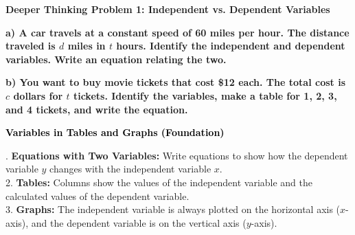 \documentclass[12pt, letterpaper, fleqn]{article}
\begin{document}
\vspace{4mm}

\begin{tcolorbox}[colback=black!5, colframe=black!50, boxrule=1pt, arc=4mm, left=6mm, right=6mm, top=5mm, bottom=5mm]
\textbf{Deeper Thinking Problem 1: Independent vs. Dependent Variables}

\medskip

\noindent
\textbf{a) A car travels at a constant speed of 60 miles per hour. The distance traveled is $d$ miles in $t$ hours. Identify the independent and dependent variables. Write an equation relating the two.}

\vspace{2.5cm}

\noindent
\textbf{b) You want to buy movie tickets that cost \$12 each. The total cost is $c$ dollars for $t$ tickets. Identify the variables, make a table for 1, 2, 3, and 4 tickets, and write the equation.}

\vspace{2cm}
\end{tcolorbox}
\newpage

\begin{tcolorbox}[colback=black!10]
    \large\textcolor{black}{\textbf{Variables in Tables and Graphs (Foundation)}}
\end{tcolorbox}

\vspace{3mm}

. \textbf{Equations with Two Variables:} Write equations to show how the dependent variable $y$ changes with the independent variable $x$. \\
2. \textbf{Tables:} Columns show the values of the independent variable and the calculated values of the dependent variable. \\
3. \textbf{Graphs:} The independent variable is always plotted on the horizontal axis ($x$-axis), and the dependent variable is on the vertical axis ($y$-axis).

\vspace{4mm}
\end{document}
